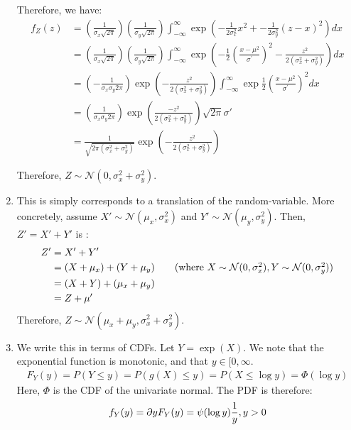\documentclass[submit]{harvardml}
\newcommand{\N}{\mathcal{N}}
\begin{document}
\begin{enumerate}[label=(\alph*)]
		Therefore, we have:
		\begin{align*}
			f_{Z}(z) &= \left(\frac{1}{\sigma_x\sqrt{2\pi}} \right)\left(\frac{1}{\sigma_y\sqrt{2\pi}} \right) \int_{-\infty}^{\infty} \exp\left({-\frac{1}{2\sigma_x^2}x^2} + -\frac{1}{2\sigma_y^2}(z-x)^2 \right) dx \\
					&= \left(\frac{1}{\sigma_x\sqrt{2\pi}} \right)\left(\frac{1}{\sigma_y\sqrt{2\pi}} \right) \int_{-\infty}^{\infty} \exp{\left( -\frac{1}{2}\left(\frac{x - \mu^2}{\sigma^{'}}\right)^2 - \frac{z^2}{2(\sigma_x^2 + \sigma_y^2)} \right)} dx \\
					&= \left( -\frac{1}{\sigma_x \sigma_y 2\pi} \right) \exp{\left(-\frac{z^2}{2(\sigma_x^2 + \sigma_y^2)} \right)}\int_{-\infty}^{\infty}\exp{\frac{1}{2}\left(\frac{x - \mu^2}{\sigma^{'}}\right)^2}dx \\
					&= \left( \frac{1}{\sigma_x \sigma_y 2\pi} \right) \exp{\left(\frac{-z^2}{2(\sigma_x^2 + \sigma_y^2)} \right)} \sqrt{2\pi} \sigma' \\
					&= \frac{1}{\sqrt{2\pi(\sigma_x^2 + \sigma_y^2)}}\exp{\left(-\frac{z^2}{2(\sigma_x^2 + \sigma_y^2)}\right)}
		\end{align*}
		
		Therefore, $Z \sim \N(0, \sigma^2_x + \sigma^2_y)$.
	
	\item This is simply corresponds to a translation of the random-variable. More concretely, assume $X' \sim \N(\mu_x, \sigma_x^2)$ and $Y' \sim \N(\mu_y, \sigma_y^2)$. Then, $Z' = X' + Y'$ is :
		\begin{align*}
			Z' &=  X' + Y' \\
			   &= (X + \mu_x) + (Y + \mu_y) \tag{where $X \sim \N(0, \sigma_{x}^2), Y \sim \N(0, \sigma_{y}^2)$} \\
			   &= (X+Y) + (\mu_x + \mu_y) \\
			   &= Z + \mu'
		\end{align*}
		Therefore, $Z \sim \mathcal{N}(\mu_x + \mu_y, \sigma_x^2 + \sigma_y^2)$.
	\item We write this in terms of CDFs. Let $Y = \exp(X)$. We note that the exponential function is monotonic, and that $y \in [0, \infty$. 
		\begin{align*}
			F_Y(y) = P(Y \leq y) = P(g(X) \leq y) = P(X \leq \log y) = \Phi(\log y)
		\end{align*}
		Here, $\Phi$ is the CDF of the univariate normal. The PDF is therefore:
		\begin{align*}
			f_Y(y) = \partial{y} F_Y(y) = \psi(\log y)\frac{1}{y}, \space y >0
		\end{align*}
\end{enumerate}
\end{document}
